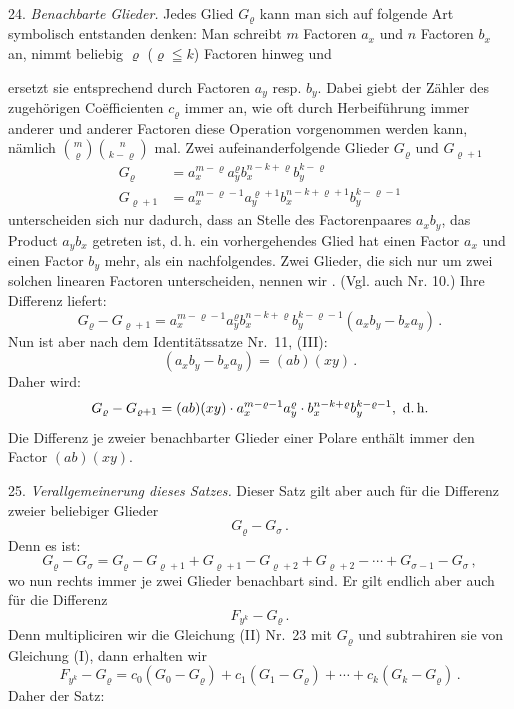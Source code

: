 24. \textit{Benachbarte Glieder.} Jedes Glied $G_\varrho$ kann man sich auf folgende Art symbolisch entstanden denken: Man schreibt $m$ Factoren $a_x$ und $n$ Factoren $b_x$ an, nimmt beliebig $\varrho$ ($\varrho\leqq k$) Factoren hinweg und


ersetzt sie entsprechend durch Factoren $a_y$ resp. $b_y$. Dabei giebt der Zähler des zugehörigen Co\"efficienten $c_\varrho$ immer an, wie oft durch Herbeiführung immer anderer und anderer Factoren diese Operation vorgenommen werden kann, nämlich $\binom{m}{\varrho}\binom{n}{k-\varrho}$ mal. Zwei aufeinanderfolgende Glieder $G_\varrho$ und $G_{\varrho+1}$
\[
\begin{aligned}
G_\varrho &= a_x^{m-\varrho}a_y^\varrho b_x^{n-k+\varrho}b_y^{k-\varrho}\\
G_{\varrho+1} &= a_x^{m-\varrho-1}a_y^{\varrho+1}b_x^{n-k+\varrho+1}b_y^{k-\varrho-1}
\end{aligned}
\]
unterscheiden sich nur dadurch, dass an Stelle des Factorenpaares $a_xb_y$, das Product $a_yb_x$ getreten ist, d.\,h. ein vorhergehendes Glied hat einen Factor $a_x$ und einen Factor $b_y$ mehr, als ein nachfolgendes. Zwei Glieder, die sich nur um zwei solchen linearen Factoren unterscheiden, nennen wir \glqq{}\grqq{}. (Vgl. auch Nr. 10.) Ihre Differenz liefert:
\[
G_\varrho-G_{\varrho+1}=a_x^{m-\varrho-1}a_y^\varrho b_x^{n-k+\varrho}b_y^{k-\varrho-1}(a_xb_y-b_xa_y)\,.
\]
Nun ist aber nach dem Identitätssatze Nr.\ 11, (III):
\[
(a_xb_y-b_xa_y)=(ab)(xy)\,.
\]
Daher wird:
\[
G_\varrho-G_{\varrho+1}=(ab)(xy)\cdot a_x^{m-\varrho-1}a_y^\varrho\cdot b_x^{n-k+\varrho}b_y^{k-\varrho-1},\ \text{d.\,h.}
\]
\glqq Die Differenz je zweier benachbarter Glieder einer Polare enthält immer den Factor $(ab)(xy)$.\grqq{}

25. \textit{Verallgemeinerung dieses Satzes.} Dieser Satz gilt aber auch für die Differenz zweier beliebiger Glieder
\[
G_\varrho-G_\sigma\,.
\]
Denn es ist:
\[
G_\varrho-G_\sigma=G_\varrho-G_{\varrho+1}+G_{\varrho+1}-G_{\varrho+2}+G_{\varrho+2}-\cdots+G_{\sigma-1}-G_\sigma\,,
\]
wo nun rechts immer je zwei Glieder benachbart sind. Er gilt endlich aber auch für die Differenz
\[
F_{y^k}-G_\varrho\,.
\]
Denn multipliciren wir die Gleichung (II) Nr.\ 23 mit $G_\varrho$ und subtrahiren sie von Gleichung (I), dann erhalten wir
\[
F_{y^k}-G_\varrho=c_0(G_0-G_\varrho)+c_1(G_1-G_\varrho)+\cdots+c_k(G_k-G_\varrho)\,.
\]
Daher der Satz:

